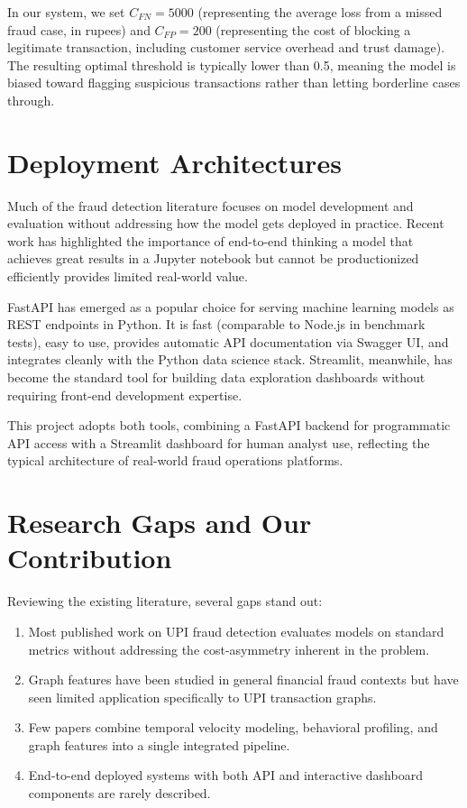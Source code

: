 In our system, we set $C_{FN} = 5000$ (representing the average loss from a missed fraud case, in rupees) and $C_{FP} = 200$ (representing the cost of blocking a legitimate transaction, including customer service overhead and trust damage). The resulting optimal threshold is typically lower than 0.5, meaning the model is biased toward flagging suspicious transactions rather than letting borderline cases through.

\section{Deployment Architectures}

Much of the fraud detection literature focuses on model development and evaluation without addressing how the model gets deployed in practice. Recent work has highlighted the importance of end-to-end thinking a model that achieves great results in a Jupyter notebook but cannot be productionized efficiently provides limited real-world value.

FastAPI has emerged as a popular choice for serving machine learning models as REST endpoints in Python. It is fast (comparable to Node.js in benchmark tests), easy to use, provides automatic API documentation via Swagger UI, and integrates cleanly with the Python data science stack. Streamlit, meanwhile, has become the standard tool for building data exploration dashboards without requiring front-end development expertise.

This project adopts both tools, combining a FastAPI backend for programmatic API access with a Streamlit dashboard for human analyst use, reflecting the typical architecture of real-world fraud operations platforms.

\section{Research Gaps and Our Contribution}

Reviewing the existing literature, several gaps stand out:

\begin{enumerate}
    \item Most published work on UPI fraud detection evaluates models on standard metrics without addressing the cost-asymmetry inherent in the problem.
    \item Graph features have been studied in general financial fraud contexts but have seen limited application specifically to UPI transaction graphs.
    \item Few papers combine temporal velocity modeling, behavioral profiling, and graph features into a single integrated pipeline.
    \item End-to-end deployed systems with both API and interactive dashboard components are rarely described.
\end{enumerate}

